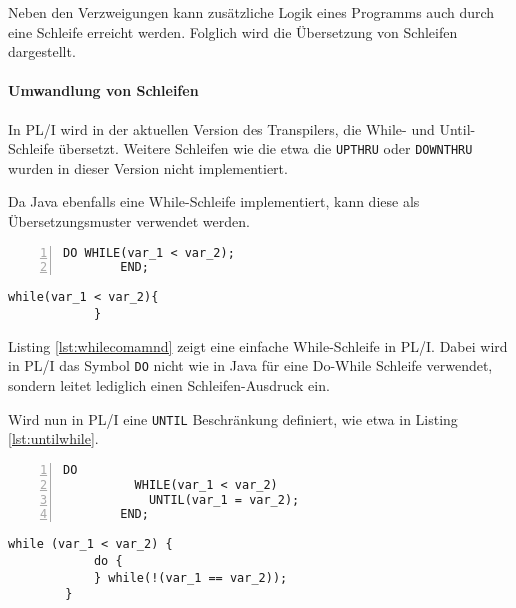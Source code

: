 Neben den Verzweigungen kann zusätzliche Logik eines Programms auch durch eine Schleife erreicht werden.
Folglich wird die Übersetzung von Schleifen dargestellt.
\pagebreak
\paragraph{Umwandlung von Schleifen}
In PL/I wird in der aktuellen Version des Transpilers, die  While- und Until-Schleife übersetzt.
Weitere Schleifen wie die etwa die \verb+UPTHRU+ oder \verb+DOWNTHRU+ wurden in dieser Version nicht implementiert.

Da Java ebenfalls eine While-Schleife implementiert, kann diese als Übersetzungsmuster verwendet werden.

\begin{minipage}[b]{0.48\linewidth}
	\centering
	\lstset{language=PL/I,label=SliceExaple}
	\begin{lstlisting}[frame=single, numbers=left, mathescape,%
		caption={While-Schleife}, label={lst:whilecomamnd}]
		DO WHILE(var_1 < var_2);
		END;
	\end{lstlisting}
\end{minipage}
\hspace{0.5cm}
\begin{minipage}[b]{0.48\linewidth}
	\centering
	\lstset{language=Java,label=SliceExaple}
	\begin{lstlisting}[frame=single, mathescape,%
		title={" "}]
			while(var_1 < var_2){
			}
	\end{lstlisting}
\end{minipage} 

Listing \ref{lst:whilecomamnd} zeigt eine einfache While-Schleife in PL/I.
Dabei wird in PL/I das Symbol \verb+DO+ nicht wie in Java für eine Do-While
Schleife verwendet, sondern leitet lediglich einen Schleifen-Ausdruck ein.

Wird nun in PL/I eine \verb+UNTIL+ Beschränkung definiert, wie etwa in Listing
\ref{lst:untilwhile}.

\begin{minipage}[b]{0.48\linewidth}
	\centering
	\lstset{language=PL/I,label=SliceExaple}
	\begin{lstlisting}[frame=single, numbers=left, mathescape,%
		caption={While-Until-Schleife}, label={lst:untilwhile}]
		DO 
		  WHILE(var_1 < var_2) 
		  	UNTIL(var_1 = var_2);
		END;
	\end{lstlisting}
\end{minipage}
\hspace{0.5cm}
\begin{minipage}[b]{0.48\linewidth}
	\centering
	\lstset{language=Java,label=SliceExaple}
	\begin{lstlisting}[frame=single, mathescape,%
		title={" "}]
		while (var_1 < var_2) {
			do {
			} while(!(var_1 == var_2));
		}
	\end{lstlisting}
\end{minipage} 

